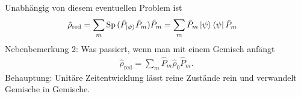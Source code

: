 	Unabhängig von diesem eventuellen Problem ist
		\begin{align}
			\hat{\rho}_{\text{red}} &= 
			\sum_m \mathrm{Sp}\, (\hat{P}_{\ket{\psi}} \hat{P}_m) \hat{P}_m =
			\sum_m \hat{P}_m \ket{\psi} \bra{\psi} \hat{P}_m 
		\end{align}
	Nebenbemerkung 2: Was passiert, wenn man mit einem Gemisch anfängt
		\begin{align*}
			\hat{\rho}_{\text{red}} = \sum_m \hat{P}_m \hat{\rho}_0 \hat{P}_m.
		\end{align*}
	Behauptung: Unitäre Zeitentwicklung lässt reine Zustände rein und verwandelt Gemische in Gemische.
	
